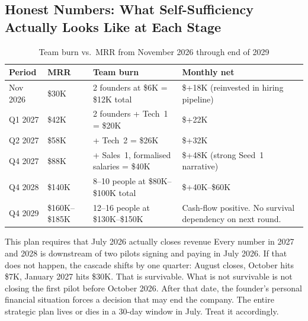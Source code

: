 \subsection*{Honest Numbers: What Self-Sufficiency Actually Looks Like at Each Stage}

\begin{table}[H]
\centering
\renewcommand{\arraystretch}{1.55}
\begin{tabularx}{\textwidth}{@{}llXX@{}}
\toprule
\textbf{Period} & \textbf{MRR} & \textbf{Team burn} &
\textbf{Monthly net} \\
\midrule
Nov 2026 & \$30K & 2 founders at \$6K = \$12K total & \$+18K (reinvested
  in hiring pipeline) \\
Q1 2027  & \$42K & 2 founders + Tech~1 = \$20K & \$+22K \\
Q2 2027  & \$58K & + Tech~2 = \$26K & \$+32K \\
Q4 2027  & \$88K & + Sales~1, formalised salaries = \$40K &
  \$+48K (strong Seed~1 narrative) \\
Q4 2028  & \$140K & 8--10 people at \$80K--\$100K total & \$+40K--\$60K \\
Q4 2029  & \$160K--\$185K & 12--16 people at \$130K--\$150K &
  Cash-flow positive. No survival dependency on next round. \\
\bottomrule
\end{tabularx}
\caption{Team burn vs.\ MRR from November 2026 through end of 2029}
\end{table}

\begin{warnbox}{This plan requires that July 2026 actually closes revenue}
Every number in 2027 and 2028 is downstream of two pilots signing and
paying in July 2026. If that does not happen, the cascade shifts by
one quarter: August closes, October hits \$7K, January 2027 hits
\$30K. That is survivable. What is not survivable is not closing the
first pilot before October 2026. After that date, the founder's personal
financial situation forces a decision that may end the company. The
entire strategic plan lives or dies in a 30-day window in July. Treat
it accordingly.
\end{warnbox}
